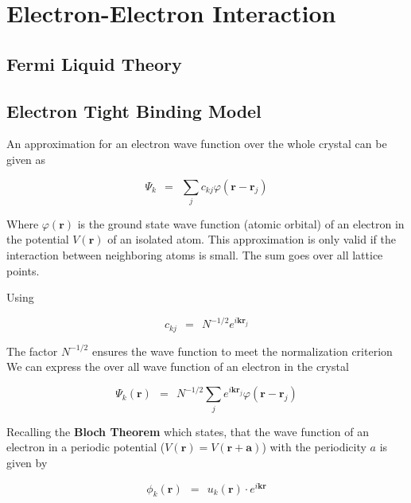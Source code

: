 \documentclass[10pt]{report}
\numberwithin{equation}{chapter}
\begin{document}
\chapter{Electron-Electron Interaction}


\section{Fermi Liquid Theory}

\section{Electron Tight Binding Model}
%



An approximation for an electron wave function over the whole crystal can be given as

\begin{equation}
  \Psi_k ~~=~~ \sum_j c_{kj} \varphi(\mathbf{r}-\mathbf{r}_j)
\end{equation}

Where $\varphi(\mathbf{r})$ is the ground state wave function (atomic orbital) of an electron in the potential $V(\mathbf{r})$ of an isolated atom. This approximation is only valid if the interaction between neighboring atoms is small. The sum goes over all lattice points.


Using

\begin{equation}
  c_{kj} ~~=~~ N^{-1/2} e^{i \mathbf{k} \mathbf{r}_j}
\end{equation}

The factor $N^{-1/2}$ ensures the wave function to meet the normalization criterion
We can express the over all wave function of an electron in the crystal

\begin{equation} \label{eq:el_wf}
  \Psi_k(\mathbf{r}) 
  ~~=~~ N^{-1/2} \sum_j e^{i\mathbf{k} \mathbf{r}_j} \varphi(\mathbf{r} - \mathbf{r}_j)
\end{equation}


Recalling the \textbf{Bloch Theorem} which states, that the wave function of an electron in a periodic potential ($V(\mathbf{r}) = V(\mathbf{r} + \mathbf{a})$) with the periodicity $a$ is given by

\begin{equation} \label{eq:bloch_theorem}
  \phi_k(\mathbf{r}) ~~=~~ u_k(\mathbf{r}) \cdot e^{i\mathbf{k} \mathbf{r}}
\end{equation}
\end{document}
